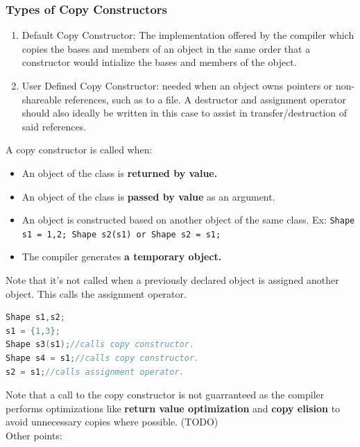 \documentclass{report}
\begin{document}
\subsubsection{Types of Copy Constructors}
\begin{enumerate}
\item Default Copy Constructor: The implementation offered by the compiler which copies the bases and members of an object in the same order that a constructor would intialize the bases and members of the object.
\item User Defined Copy Constructor: needed when an object owns pointers or non-shareable references, such as to a file. A destructor and assignment operator should also ideally be written in this case to assist in transfer/destruction of said references.
\end{enumerate}
A copy constructor is called when:
\begin{itemize}
\item An object of the class is \textbf{returned by value.}
\item An object of the class is \textbf{passed by value} as an argument.
\item An object is constructed based on another object of the same class. Ex: \texttt{Shape s1 = {1,2}; Shape s2(s1) or Shape s2 = s1;}
\item The compiler generates \textbf{a temporary object.}
\end{itemize}
Note that it's not called when a previously declared object is assigned another object. This calls the assignment operator.
\begin{lstlisting}[language=C++]
Shape s1,s2;
s1 = {1,3};
Shape s3(s1);//calls copy constructor.
Shape s4 = s1;//calls copy constructor.
s2 = s1;//calls assignment operator.
\end{lstlisting}
Note that a call to the copy constructor is not guarranteed as
the compiler performs optimizations like \textbf{return value 
optimization} and \textbf{copy elision} to avoid unnecessary 
copies where possible. (TODO)\\
Other points:
\end{document}
